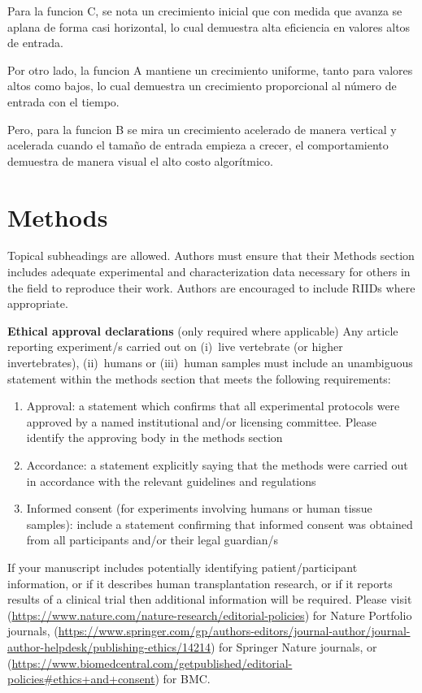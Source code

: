 \documentclass[pdflatex,sn-mathphys-num]{sn-jnl}%
\theoremstyle{thmstyleone}%
\theoremstyle{thmstyletwo}%
\theoremstyle{thmstylethree}%
\begin{document}
Para la funcion C, se nota un crecimiento inicial que con medida que avanza se aplana de forma casi horizontal, lo cual demuestra alta eficiencia en valores altos de entrada.

Por otro lado, la funcion A mantiene un crecimiento uniforme, tanto para valores altos como bajos, lo cual demuestra un crecimiento proporcional al número de entrada con el tiempo.

Pero, para la funcion B se mira un crecimiento acelerado de manera vertical y acelerada cuando el tamaño de entrada empieza a crecer, el comportamiento demuestra de manera visual el alto costo algorítmico. 

\section{Methods}\label{sec11}

Topical subheadings are allowed. Authors must ensure that their Methods section includes adequate experimental and characterization data necessary for others in the field to reproduce their work. Authors are encouraged to include RIIDs where appropriate. 

\textbf{Ethical approval declarations} (only required where applicable) Any article reporting experiment/s carried out on (i)~live vertebrate (or higher invertebrates), (ii)~humans or (iii)~human samples must include an unambiguous statement within the methods section that meets the following requirements: 

\begin{enumerate}[1.]
\item Approval: a statement which confirms that all experimental protocols were approved by a named institutional and/or licensing committee. Please identify the approving body in the methods section

\item Accordance: a statement explicitly saying that the methods were carried out in accordance with the relevant guidelines and regulations

\item Informed consent (for experiments involving humans or human tissue samples): include a statement confirming that informed consent was obtained from all participants and/or their legal guardian/s
\end{enumerate}

If your manuscript includes potentially identifying patient/participant information, or if it describes human transplantation research, or if it reports results of a clinical trial then  additional information will be required. Please visit (\url{https://www.nature.com/nature-research/editorial-policies}) for Nature Portfolio journals, (\url{https://www.springer.com/gp/authors-editors/journal-author/journal-author-helpdesk/publishing-ethics/14214}) for Springer Nature journals, or (\url{https://www.biomedcentral.com/getpublished/editorial-policies\#ethics+and+consent}) for BMC.
\end{document}
